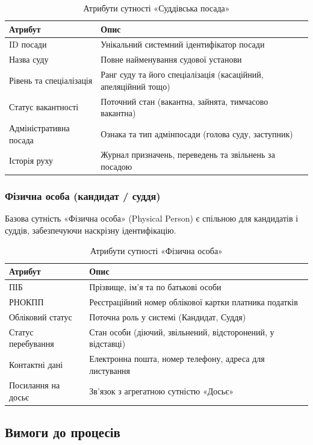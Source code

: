 \documentclass{article}
\begin{document}
\begin{table}[ht]
\caption{Атрибути сутності «Суддівська посада»}
\begin{tabular}{p{5cm}p{9cm}}
\hline
\textbf{Атрибут} & \textbf{Опис} \\
\hline
ID посади & Унікальний системний ідентифікатор посади \\
Назва суду & Повне найменування судової установи \\
Рівень та спеціалізація & Ранг суду та його спеціалізація (касаційний, апеляційний тощо) \\
Статус вакантності & Поточний стан (вакантна, зайнята, тимчасово вакантна) \\
Адміністративна посада & Ознака та тип адмінпосади (голова суду, заступник) \\
Історія руху & Журнал призначень, переведень та звільнень за посадою \\
\hline
\end{tabular}
\end{table}

\subsubsection{Фізична особа (кандидат / суддя)}
Базова сутність «Фізична особа» (Physical Person) є спільною для кандидатів і суддів, забезпечуючи наскрізну ідентифікацію.

\begin{table}[ht]
\caption{Атрибути сутності «Фізична особа»}
\begin{tabular}{p{5cm}p{9cm}}
\hline
\textbf{Атрибут} & \textbf{Опис} \\
\hline
ПІБ & Прізвище, ім'я та по батькові особи \\
РНОКПП & Реєстраційний номер облікової картки платника податків \\
Обліковий статус & Поточна роль у системі (Кандидат, Суддя) \\
Статус перебування & Стан особи (діючий, звільнений, відсторонений, у відставці) \\
Контактні дані & Електронна пошта, номер телефону, адреса для листування \\
Посилання на досьє & Зв'язок з агрегатною сутністю «Досьє» \\
\hline
\end{tabular}
\end{table}

\subsection{Вимоги до процесів}
\end{document}
